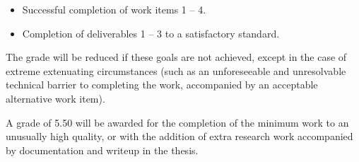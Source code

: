 \documentclass[a4paper,10pt,parskip=half]{scrartcl}
\begin{document}
\begin{itemize}
  \item Successful completion of work items 1 -- 4.
  \item Completion of deliverables 1 -- 3 to a satisfactory standard.
\end{itemize}

The grade will be reduced if these goals are not achieved, except in the case
of extreme extenuating circumstances (such as an unforeseeable and unresolvable
technical barrier to completing the work, accompanied by an acceptable
alternative work item).

A grade of 5.50 will be awarded for the completion of the minimum work to an
unusually high quality, or with the addition of extra research work accompanied
by documentation and writeup in the thesis.

\end{document}
